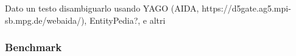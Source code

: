 Dato un testo disambiguarlo usando YAGO (AIDA, https://d5gate.ag5.mpi-sb.mpg.de/webaida/), EntityPedia?, e altri

\subsubsection{Benchmark}
